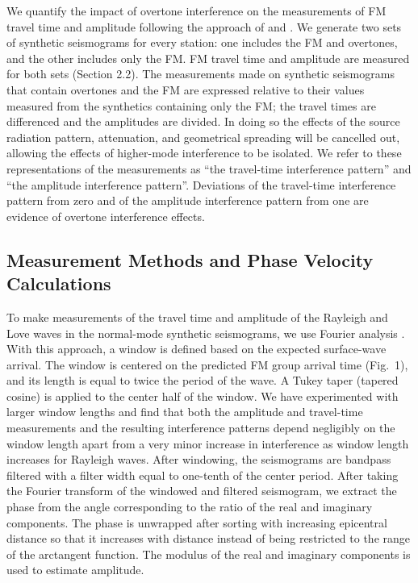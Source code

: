 \documentclass[extra,mreferee]{gji}
\begin{document}
We quantify the impact of overtone interference on the measurements of FM travel time and amplitude following the approach of \citet{hariharan2020evidence} and \citet{foster2014overtone}. We generate two sets of synthetic seismograms for every station: one includes the FM and overtones, and the other includes only the FM. FM travel time and amplitude are measured for both sets (Section 2.2). The measurements made on synthetic seismograms that contain overtones and the FM are  expressed relative to their values measured from the synthetics containing only
the FM; the travel times are differenced and the amplitudes are divided. In doing so the effects of the source radiation pattern, attenuation, and geometrical
spreading will be cancelled out, allowing the effects of higher-mode interference to be isolated. We refer to these representations of the measurements as ``the travel-time interference pattern'' and ``the amplitude interference pattern''. Deviations of the travel-time interference pattern from zero and of the amplitude interference pattern from one are evidence of overtone interference effects.

\subsection{Measurement Methods and Phase Velocity Calculations}

To make measurements of the travel time and amplitude of the Rayleigh and Love waves in the normal-mode synthetic seismograms, we use Fourier analysis \citep{forsyth2005array}. With this approach, a window is defined based on the expected surface-wave arrival. The window is centered on the predicted FM group arrival time (Fig.\ 1), and its length is equal to twice the period of the wave. A Tukey taper (tapered cosine) is applied to the center half of the window. We have experimented with larger window lengths and find that both the amplitude and travel-time measurements and the resulting interference patterns depend negligibly on the window length apart from a very minor increase in interference as window length increases for Rayleigh waves. After windowing, the seismograms are bandpass filtered with a filter width equal to one-tenth of the center period. After taking the Fourier transform of the windowed and filtered seismogram, we extract the phase from the angle corresponding to the ratio of the real and imaginary components. The phase is unwrapped after sorting with increasing epicentral distance so that it increases with distance instead of being restricted to the range of the arctangent function. The modulus of the real and imaginary components is used to estimate amplitude. 
\end{document}
